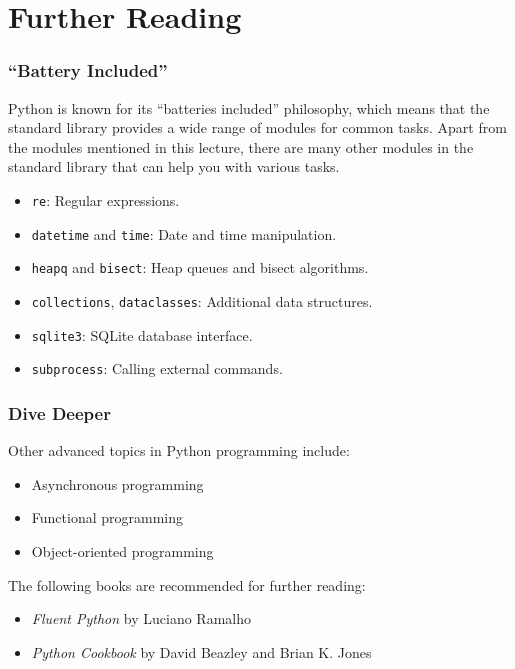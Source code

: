 \documentclass[beamer, en, version=2.0]{huangfusl-template}
\begin{document}
    \section{Further Reading}
    \begin{frame}[fragile]
        \frametitle{``Battery Included''}

        Python is known for its ``batteries included'' philosophy, which means that the standard library provides a wide range of modules for common tasks. Apart from the modules mentioned in this lecture, there are many other modules in the standard library that can help you with various tasks.

        \begin{itemize}
            \item {\footnotesize\verb|re|}: Regular expressions.
            \item {\footnotesize\verb|datetime|} and {\footnotesize\verb|time|}: Date and time manipulation.
            \item {\footnotesize\verb|heapq|} and {\footnotesize\verb|bisect|}: Heap queues and bisect algorithms.
            \item {\footnotesize\verb|collections|}, {\footnotesize\verb|dataclasses|}: Additional data structures.
            \item {\footnotesize\verb|sqlite3|}: SQLite database interface.
            \item {\footnotesize\verb|subprocess|}: Calling external commands.
        \end{itemize}
    \end{frame}
    \begin{frame}
        \frametitle{Dive Deeper}

        Other advanced topics in Python programming include:

        \begin{itemize}
            \item Asynchronous programming
            \item Functional programming
            \item Object-oriented programming
        \end{itemize}

        The following books are recommended for further reading:

        \begin{itemize}
            \item \textit{Fluent Python} by Luciano Ramalho
            \item \textit{Python Cookbook} by David Beazley and Brian K. Jones
        \end{itemize}
    \end{frame}
    \begin{frame}
        \mythanks
    \end{frame}
\end{document}
